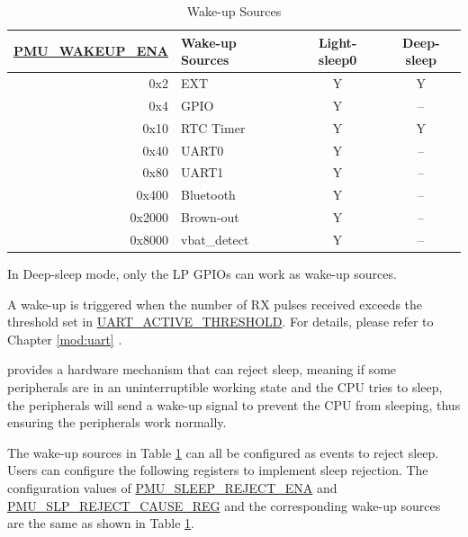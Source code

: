 \documentclass[main\_\_EN.tex]{subfiles}
\begin{document}
\begin{table}[H]
    \centering
    \caption{Wake-up Sources}
    \label{tab:lowpowm-wakeup-source}
    \begin{threeparttable}
    \begin{tabular}{| r | l | c | c |}
    \hline
    \rowcolor{lightgray}
    \textbf{\hyperref[fielddesc:PMUWAKEUPENA]{PMU\_WAKEUP\_ENA}} & \textbf{Wake-up Sources} &  \textbf{Light-sleep0} & \textbf{Deep-sleep}  \\\hline
    0x2 & EXT & Y & Y \\\hline
    0x4 & GPIO\tnote{1} & Y & – \\\hline
    0x10 & RTC Timer  & Y & Y \\\hline
    0x40 & UART0\tnote{2} & Y & – \\\hline
    0x80 & UART1\tnote{2} & Y & – \\\hline
    0x400 & Bluetooth & Y & – \\\hline
    0x2000 & Brown-out & Y & – \\\hline
    0x8000 & vbat\_detect & Y & – \\\hline
    \end{tabular}

\begin{tablenotes}
    \item[1] In Deep-sleep mode, only the LP GPIOs can work as wake-up sources.
    \item[2] A wake-up is triggered when the number of RX pulses received exceeds the threshold set in \hyperref[fielddesc:UARTACTIVETHRESHOLD]{UART\_ACTIVE\_THRESHOLD}. For details, please refer to Chapter \ref{mod:uart} \textit{}.
\end{tablenotes}
\end{threeparttable}
\end{table}

\chipname{} provides a hardware mechanism that can reject sleep, meaning if some peripherals are in an uninterruptible working state and the CPU tries to sleep, the peripherals will send a wake-up signal to prevent the CPU from sleeping, thus ensuring the peripherals work normally.

The wake-up sources in Table \ref{tab:lowpowm-wakeup-source} can all be configured as events to reject sleep. Users can configure the following registers to implement sleep rejection. The configuration values of \hyperref[fielddesc:PMUSLEEPREJECTENA]{PMU\_SLEEP\_REJECT\_ENA} and \hyperref[fielddesc:PMUREJECTCAUSE]{PMU\_SLP\_REJECT\_CAUSE\_REG} and the corresponding wake-up sources are the same as shown in Table \ref{tab:lowpowm-wakeup-source}.
\end{document}
